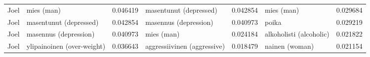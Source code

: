\begin{tabular}{llrlrlr}
  Joel &                 mies (man) &                         0.046419 &      masentunut (depressed) &                              0.042854 &                 mies (man) &                        0.029684 \\
  Joel &     masentunut (depressed) &                         0.042854 &       masennus (depression) &                              0.040973 &                      poika &                        0.029219 \\
  Joel &      masennus (depression) &                         0.040973 &                  mies (man) &                              0.024184 &    alkoholisti (alcoholic) &                        0.021822 \\
  Joel & ylipainoinen (over-weight) &                         0.036643 & aggressiivinen (aggressive) &                              0.018479 &             nainen (woman) &                        0.021154 \\
\bottomrule
\end{tabular}
